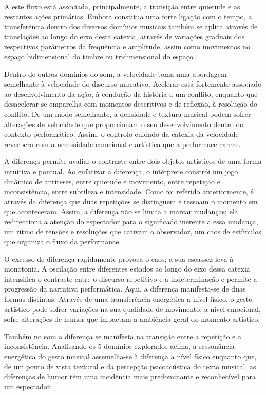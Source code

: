 \documentclass[../main.tex]{subfiles}
\begin{document}
A este fluxo está associada, principalmente, a transição entre quietude e as restantes ações primárias. Embora constitua uma forte ligação com o tempo, a transferência dentro dos diversos domínios musicais também se aplica através de translações ao longo do eixo desta catexia, através de variações graduais dos respectivos parâmetros da frequência e amplitude, assim como movimentos no espaço bidimensional do timbre ou tridimensional do espaço.

Dentro de outros domínios do som, a velocidade toma uma abordagem semelhante à velocidade do discurso narrativo. Acelerar está fortemente associado ao desenvolvimento da ação, à condução da história a um conflito, enquanto que desacelerar se emparelha com momentos descritivos e de reflexão, à resolução do conflito. De um modo semelhante, a densidade e textura musical podem sofrer alterações de velocidade que proporcionam o seu desenvolvimento dentro do contexto performático. Assim, o controlo cuidado da catexia da velocidade reverbera com a necessidade emocional e artística que a performace carece.


A diferença permite avaliar o contraste entre dois objetos artísticos de uma forma intuitiva e pontual. Ao enfatizar a diferença, o intérprete constrói um jogo dinâmico de antíteses, entre quietude e movimento, entre repetição e inconsistência, entre subtileza e intensidade. Como foi referido anteriormente, é através da diferença que duas repetições se distinguem e ressoam o momento em que aconteceram. Assim, a diferença não se limita a marcar mudanças; ela redirecciona a atenção do espectador para o significado inerente a essa mudança, um rítmo de tensões e resoluções que cativam o observador, um caos de estímulos que organiza o fluxo da performance.

O excesso de diferença rapidamente provoca o caos; a sua escassez leva à monotonia. A oscilação entre diferentes estados ao longo do eixo dessa catexia intensifica o contraste entre o discurso repetitivo e a indeterminação e permite a progressão da narrativa performática. Aqui, a diferença manifesta-se de duas formas distintas. Através de uma transferência energética a nível físico, o gesto artístico pode sofrer variações na sua qualidade de movimento; a nível emocional, sofre alterações de humor que impactam a ambiência geral do momento artístico.

Também no som a diferença se manifesta na transição entre a repetição e a inconsistência. Analisando os 5 domínios explorados acima, a ressonância energética do gesto musical assemelha-se à diferença a nível físico enquanto que, de um ponto de vista textural e da percepção psicoacústica do texto musical, as diferenças de humor têm uma incidência mais predominante e reconhecível para um espectador.
\end{document}

